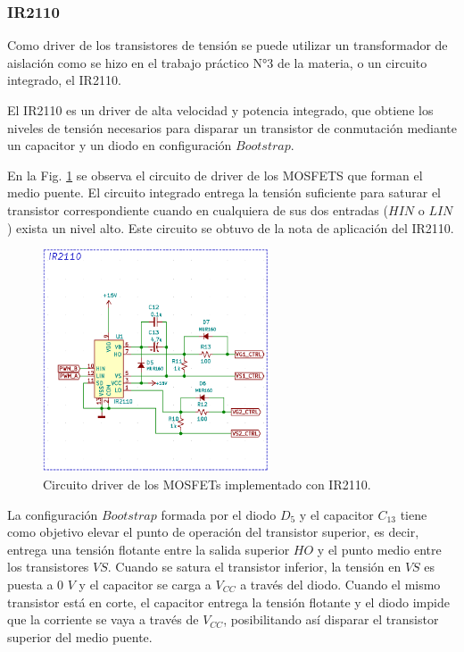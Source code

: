 \documentclass[11pt, a4paper]{article}
\begin{document}
\subsubsection{IR2110}
Como driver de los transistores de tensión se puede utilizar un transformador de aislación como se hizo en el trabajo práctico N°3 de la materia, o un circuito integrado, el IR2110.

El IR2110 es un driver de alta velocidad y potencia integrado, que obtiene los niveles de tensión necesarios para disparar un transistor de conmutación mediante un capacitor y un diodo en configuración $Bootstrap$. 

En la Fig. \ref{driver} se observa el circuito de driver de los MOSFETS que forman el medio puente. El circuito integrado entrega la tensión suficiente para saturar el transistor correspondiente cuando en cualquiera de sus dos entradas ($HIN$ o $LIN$) exista un nivel alto. Este circuito se obtuvo de la nota de aplicación del IR2110.

\begin{figure}[h]
	\centering
	\includegraphics[width = 0.6\textwidth]{Imagenes/driver}
	\caption{Circuito driver de los MOSFETs implementado con IR2110.}
	\label{driver}
\end{figure}

La configuración $Bootstrap$ formada por el diodo $D_5$ y el capacitor $C_{13}$ tiene como objetivo elevar el punto de operación del transistor superior, es decir, entrega una tensión flotante entre la salida superior $HO$ y el punto medio entre los transistores $VS$. Cuando se satura el transistor inferior, la tensión en $VS$ es puesta a $0$ $V$ y el capacitor se carga a $V_{CC}$ a través del diodo. Cuando el mismo transistor está en corte, el capacitor entrega la tensión flotante y el diodo impide que la corriente se vaya a través de $V_{CC}$, posibilitando así disparar el transistor superior del medio puente.
\end{document}
